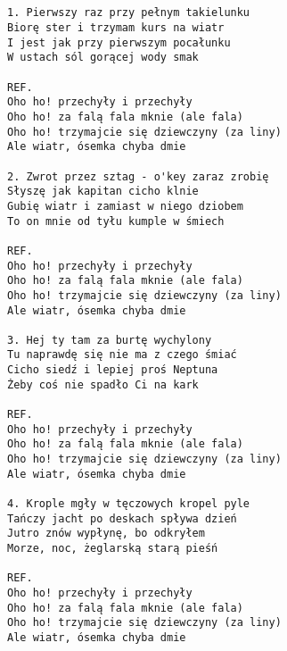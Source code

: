 \documentclass[12pt]{article}
\begin{document}
\subsection*{}
\begin{verbatim}
1. Pierwszy raz przy pełnym takielunku
Biorę ster i trzymam kurs na wiatr
I jest jak przy pierwszym pocałunku
W ustach sól gorącej wody smak

REF.
Oho ho! przechyły i przechyły
Oho ho! za falą fala mknie (ale fala)
Oho ho! trzymajcie się dziewczyny (za liny)
Ale wiatr, ósemka chyba dmie

2. Zwrot przez sztag - o'key zaraz zrobię
Słyszę jak kapitan cicho klnie
Gubię wiatr i zamiast w niego dziobem
To on mnie od tyłu kumple w śmiech

REF.
Oho ho! przechyły i przechyły
Oho ho! za falą fala mknie (ale fala)
Oho ho! trzymajcie się dziewczyny (za liny)
Ale wiatr, ósemka chyba dmie

3. Hej ty tam za burtę wychylony
Tu naprawdę się nie ma z czego śmiać
Cicho siedź i lepiej proś Neptuna
Żeby coś nie spadło Ci na kark

REF.
Oho ho! przechyły i przechyły
Oho ho! za falą fala mknie (ale fala)
Oho ho! trzymajcie się dziewczyny (za liny)
Ale wiatr, ósemka chyba dmie

4. Krople mgły w tęczowych kropel pyle
Tańczy jacht po deskach spływa dzień
Jutro znów wypłynę, bo odkryłem
Morze, noc, żeglarską starą pieśń

REF.
Oho ho! przechyły i przechyły
Oho ho! za falą fala mknie (ale fala)
Oho ho! trzymajcie się dziewczyny (za liny)
Ale wiatr, ósemka chyba dmie
\end{verbatim}
\clearpage
\end{document}
